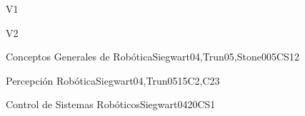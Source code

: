 \begin{syllabus}
\begin{competences}{V1}
    \item {} 
    \item {} 
    \item {} 
    \item {}	
\end{competences}

\begin{competences}{V2}
    \item {} 
    \item {} 
    \item {} 
    \item {}
\end{competences}

\begin{unit}{\ISRobotics}{Conceptos Generales de Robótica}{Siegwart04,Trun05,Stone00}{5}{CS12}
\begin{topics}%
	\item \ISRoboticsTopicOverview
	\item \ISRoboticsTopicConfiguration
\end{topics}
\begin{learningoutcomes}
  
	\item \ISRoboticsLOListCapabilities [\Familiarity]
	\item \ISRoboticsLOIntegrate [\Usage]
\end{learningoutcomes}
\end{unit}

\begin{unit}{\ISRobotics}{Percepción Robótica}{Siegwart04,Trun05}{15}{C2,C23}
\begin{topics}%
	\item \ISRoboticsTopicInterpreting
	\item \ISRoboticsTopicLocalizing
\end{topics}
\begin{learningoutcomes}
	\item \ISRoboticsLOProgram [\Usage]
	\item \ISRoboticsLOImplementFundamental [\Usage]
\end{learningoutcomes}
\end{unit}

\begin{unit}{\ISRobotics}{Control de Sistemas Robóticos}{Siegwart04}{20}{CS1}
\begin{topics}%
	\item \ISRoboticsTopicNavigation
	\item \ISRoboticsTopicMotion
\end{topics}
\begin{learningoutcomes}
	\item \ISRoboticsLOCharacterizeTheWith [\Usage]
	\item \ISRoboticsLOListTheRobots [\Usage]
\end{learningoutcomes}
\end{unit}


\end{syllabus}
